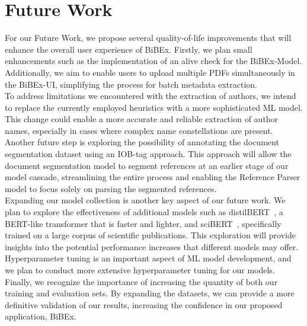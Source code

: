\section{Future Work}
For our Future Work, we propose several quality-of-life improvements that will enhance the overall user experience of BiBEx. Firstly, we plan small enhancements such as the implementation of an alive check for the BiBEx-Model. Additionally, we aim to enable users to upload multiple PDFs simultaneously in the BiBEx-UI, simplifying the process for batch metadata extraction.\\
To address limitations we encountered with the extraction of authors, we intend to replace the currently employed heuristics with a more sophisticated ML model. This change could enable a more accurate and reliable extraction of author names, especially in cases where complex name constellations are present.\\
Another future step is exploring the possibility of annotating the document segmentation dataset using an IOB-tag approach. This approach will allow the document segmentation model to segment references at an earlier stage of our model cascade, streamlining the entire process and enabling the Reference Parser model to focus solely on parsing the segmented references.\\
Expanding our model collection is another key aspect of our future work. We plan to explore the effectiveness of additional models such as distilBERT~\cite{sanh2019distilbert}, a BERT-like transformer that is faster and lighter, and sciBERT~\cite{beltagy2019scibert}, specifically trained on a large corpus of scientific publications. This exploration will provide insights into the potential performance increases that different models may offer.\\
Hyperparameter tuning is an important aspect of ML model development, and we plan to conduct more extensive hyperparameter tuning for our models.\\
Finally, we recognize the importance of increasing the quantity of both our training and evaluation sets. By expanding the datasets, we can provide a more definitive validation of our results, increasing the confidence in our proposed application, BiBEx.